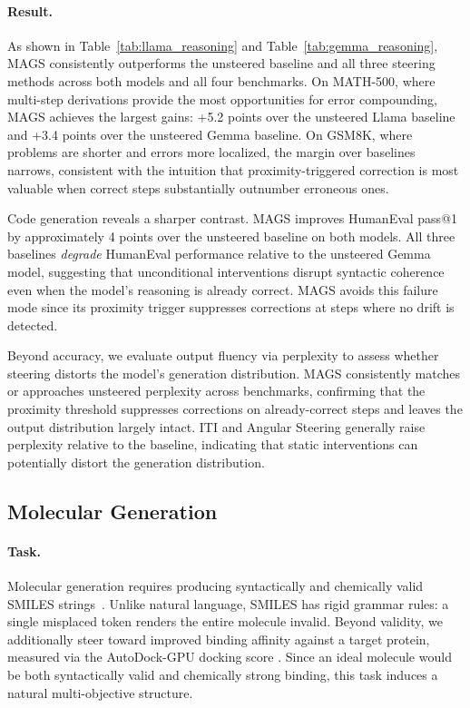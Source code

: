 \documentclass{article}
\newcommand{\ours}{MAGS}
\begin{document}

\paragraph{Result.} As shown in Table~\ref{tab:llama_reasoning} and Table~\ref{tab:gemma_reasoning}, \ours{} consistently outperforms the unsteered baseline and all three steering methods across both models and all four benchmarks. On MATH-500, where multi-step derivations provide the most opportunities for error compounding, \ours{} achieves the largest gains: +5.2 points over the unsteered Llama baseline and +3.4  points over the unsteered Gemma baseline. On GSM8K, where problems are shorter and errors more localized, the margin over baselines narrows, consistent with the intuition that proximity-triggered correction is most valuable when correct steps substantially outnumber erroneous ones.

Code generation reveals a sharper contrast. \ours{} improves HumanEval pass@1 by approximately 4 points over the unsteered baseline on both models. All three baselines \emph{degrade} HumanEval performance relative to the unsteered Gemma model, suggesting that unconditional interventions disrupt syntactic coherence even when the model's reasoning is already correct. \ours{} avoids this failure mode since its proximity trigger suppresses corrections at steps where no drift is detected.

Beyond accuracy, we evaluate output fluency via perplexity to assess whether steering distorts the model's generation distribution. MAGS consistently matches or approaches unsteered perplexity across benchmarks, confirming that the proximity threshold suppresses corrections on already-correct steps and leaves the output distribution largely intact. ITI and Angular Steering generally raise perplexity relative to the baseline, indicating that static interventions can potentially distort the generation distribution.

\subsection{Molecular Generation}

\paragraph{Task.}
Molecular generation requires producing syntactically and chemically valid SMILES strings~\cite{weininger1988smiles}. Unlike natural language, SMILES has rigid grammar rules: a single misplaced token renders the entire molecule invalid. Beyond validity, we additionally steer toward improved binding affinity against a target protein, measured via the AutoDock-GPU docking score \cite{Santos-Martins2021}. Since an ideal molecule would be both syntactically valid and chemically strong binding, this task induces a natural multi-objective structure.
\end{document}

